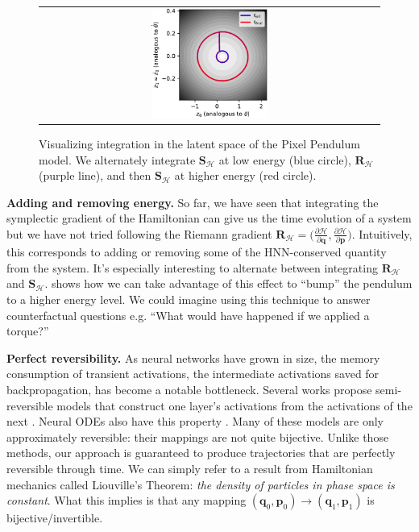 \documentclass{article}
\begin{document}
\begin{figure}
\centering
\vspace{-.7cm}%
\hspace{1cm}%
\begin{tabular}{c}
\setlength{\tabcolsep}{0pt}
\includegraphics[width=0.35\textwidth]{static/integrate-latent-hnn}
\end{tabular}
\caption{
  Visualizing integration in the latent space of the Pixel Pendulum model. We alternately integrate $\mathbf{S_{\mathcal{H}}}$ at low energy (blue circle), $\mathbf{R_{\mathcal{H}}}$ (purple line), and then $\mathbf{S_{\mathcal{H}}}$ at higher energy (red circle).
}
\end{figure}

\textbf{Adding and removing energy.} So far, we have seen that integrating the symplectic gradient of the Hamiltonian can give us the time evolution of a system but we have not tried following the Riemann gradient $\mathbf{R_{\mathcal{H}}} = \big(\frac{\partial \mathcal{H}}{\partial \mathbf{q}},  \frac{\partial \mathcal{H}}{\partial \mathbf{p}} \big)$.
Intuitively, this corresponds to adding or removing some of the HNN-conserved quantity from the system. It's especially interesting to alternate between integrating $\mathbf{R_{\mathcal{H}}}$ and $\mathbf{S_{\mathcal{H}}}$.  shows how we can take advantage of this effect to ``bump'' the pendulum to a higher energy level. We could imagine using this technique to answer counterfactual questions e.g. ``What would have happened if we applied a torque?''

\textbf{Perfect reversibility.} As neural networks have grown in size, the memory consumption of transient activations, the intermediate activations saved for backpropagation, has become a notable bottleneck. Several works propose semi-reversible models that construct one layer's activations from the activations of the next \cite{Gomez2017Reversible,mackay2018reversible, jacobsen2018revnet}. Neural ODEs also have this property \cite{Chen2018NeuralEquations}. Many of these models are only approximately reversible: their mappings are not quite bijective. Unlike those methods, our approach is guaranteed to produce trajectories that are perfectly reversible through time. We can simply refer to a result from Hamiltonian mechanics called Liouville's Theorem: \textit{the density of particles in phase space is constant}. What this implies is that any mapping $(\mathbf{q}_0,\mathbf{p}_0) \rightarrow (\mathbf{q}_1,\mathbf{p}_1)$ is bijective/invertible.
\end{document}
